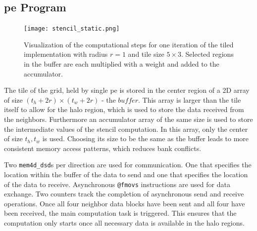 \subsection{\ac{pe} Program}


\begin{figure}
    \centering
    \texttt{[image: stencil\_static.png]}
    \caption{Visualization of the computational steps for one iteration of the tiled implementation with radius $r=1$ and tile size $5\times 3$. Selected regions in the buffer are each multiplied with a weight and added to the accumulator.}
    \label{fig:stencil_algorithm_animation}
\end{figure}

The tile of the grid, held by single \ac{pe} is stored in the center region of a 2D array of size $(t_h+2r)\times (t_w+2r)$ - the $buffer$. This array is larger than the tile itself to allow for the halo region, which is used to store the data received from the neighbors. Furthermore an accumulator array of the same size is used to store the intermediate values of the stencil computation. In this array, only the center of size $t_h, t_w$ is used. Choosing its size to be the same as the buffer leads to more consistent memory access patterns, which reduces bank conflicts.

Two \texttt{mem4d\_dsd}s per direction are used for communication. One that specifies the location within the buffer of the data to send and one that specifies the location of the data to receive.
Asynchronous \texttt{@fmovs} instructions are used for data exchange. Two counters track the completion of asynchronous send and receive operations. Once all four neighbor data blocks have been sent and all four have been received, the main computation task is triggered. This ensures that the computation only starts once all necessary data is available in the halo regions.

